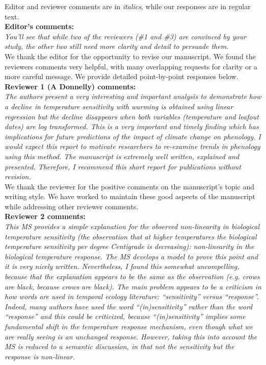 \documentclass[11pt]{article}
\begin{document}
Editor and reviewer comments are in \emph{italics}, while our responses are in regular text. \\ %

{\bf Editor's comments:} \\

\emph{You'll see that while two of the reviewers (\#1 and \#3) are convinced by your study, the other two still need more clarity and detail to persuade them.}\\

We thank the editor for the opportunity to revise our manuscript. We found the reviewers comments very helpful, with many overlapping requests for clarity or a more careful message. We provide detailed point-by-point responses below.\\

{\bf Reviewer 1 (A Donnelly) comments:} \\

\emph{The authors present a very interesting and important analysis to demonstrate how a decline in temperature sensitivity with warming is obtained using linear regression but the decline disappears when both variables (temperature and leafout dates) are log transformed. This is a very important and timely finding which has implications for future predictions of the impact of climate change on phenology. I would expect this report to motivate researchers to re-examine trends in phenology using this method. The manuscript is extremely well written, explained and presented. Therefore, I recommend this short report for publications without revision.}\\

We thank the reviewer for the positive comments on the manuscript's topic and writing style. We have worked to maintain these good aspects of the manuscript while addressing other reviewer comments. \\

{\bf Reviewer 2 comments:} \\

\emph{This MS provides a simple explanation for the observed non-linearity in biological temperature sensitivity (the observation that at higher temperatures the biological temperature sensitivity per degree Centigrade is decreasing): non-linearity in the biological temperature response. The MS develops a model to prove this point and it is very nicely written. Nevertheless, I found this somewhat uncompelling, because that the explanation appears to be the same as the observation (e.g. crows are black, because crows are black). The main problem appears to be a criticism in how words are used in temporal ecology literature: ``sensitivity'' versus ``response''. Indeed, many authors have used the word ``(in)sensitivity'' rather than the word ``response'' and this could be criticized, because ``(in)sensitivity'' implies some fundamental shift in the temperature response mechanism, even though what we are really seeing is an unchanged response. However, taking this into account the MS is reduced to a semantic discussion, in that not the sensitivity but the response is non-linear.}\\
\end{document}
